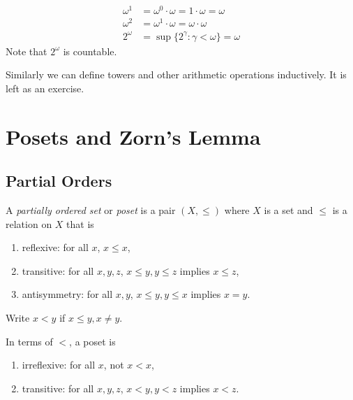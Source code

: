 \documentclass[a4paper]{article}
\begin{document}
\begin{eg}
  \begin{align*}
    \omega^1 &= \omega^0 \cdot \omega = 1 \cdot \omega = \omega \\
    \omega^2 &= \omega^1 \cdot \omega = \omega \cdot \omega \\
    2^\omega &= \sup\{2^\gamma: \gamma < \omega\} = \omega
  \end{align*}
  Note that \(2^\omega\) is countable.
\end{eg}

Similarly we can define towers and other arithmetic operations inductively. It is left as an exercise.

\section{Posets and Zorn's Lemma}

\subsection{Partial Orders}

\begin{definition}[Poset]
  A \emph{partially ordered set} or \emph{poset} is a pair \((X, \leq)\) where \(X\) is a set and \(\leq\) is a relation on \(X\) that is
  \begin{enumerate}
  \item reflexive: for all \(x\), \(x \leq x\),
  \item transitive: for all \(x, y, z\), \(x \leq y, y \leq z\) implies \(x \leq z\),
  \item antisymmetry: for all \(x, y\), \(x \leq y, y \leq x\) implies \(x = y\).
  \end{enumerate}
\end{definition}

\begin{notation}
  Write \(x < y\) if \(x \leq y, x \neq y\).

  In terms of \(<\), a poset is
  \begin{enumerate}
  \item irreflexive: for all \(x\), not \(x < x\),
  \item transitive: for all \(x, y, z\), \(x < y, y < z\) implies \(x < z\).
  \end{enumerate}
\end{notation}
\end{document}
